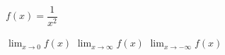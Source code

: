 \noindent\begin{minipage}[t]{0.58\linewidth}\vspace{0pt}\raggedright $f(x)=\dfrac{1}{x^2}$\end{minipage}\hfill\begin{minipage}[t]{0.4\linewidth}\vspace{0pt}\centering \resizebox{\ifdim\width>\linewidth\linewidth\else\width\fi}{!}{}\end{minipage}\par
{} $\displaystyle\lim_{x\to 0} f(x)$
 $\displaystyle\lim_{x\to\infty} f(x)$
 $\displaystyle\lim_{x\to-\infty} f(x)$
